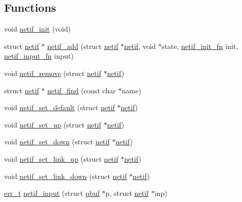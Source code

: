 \subsection*{Functions}
\begin{DoxyCompactItemize}
\item 
void \hyperlink{openmote-cc2538_2lwip_2src_2include_2lwip_2netif_8h_a0f4a53e47c840904f824a2a1c0d4ebf4}{netif\+\_\+init} (void)
\item 
struct \hyperlink{structnetif}{netif} $\ast$ \hyperlink{group__netif_gabde72af134ae7047a46ad7719d2a1ee9}{netif\+\_\+add} (struct \hyperlink{structnetif}{netif} $\ast$\hyperlink{structnetif}{netif}, void $\ast$state, \hyperlink{openmote-cc2538_2lwip_2src_2include_2lwip_2netif_8h_a2b02a78a8769925ff8e4f83d34e5e1f5}{netif\+\_\+init\+\_\+fn} init, \hyperlink{openmote-cc2538_2lwip_2src_2include_2lwip_2netif_8h_ab2302b1b64ac7b95f24c6bab754a575e}{netif\+\_\+input\+\_\+fn} input)
\item 
void \hyperlink{group__netif_ga9c6e541f0c184e1ea61a5cd8afe3e979}{netif\+\_\+remove} (struct \hyperlink{structnetif}{netif} $\ast$\hyperlink{structnetif}{netif})
\item 
struct \hyperlink{structnetif}{netif} $\ast$ \hyperlink{group__netif_ga3c82d1c742338828b2f4349a75bb84de}{netif\+\_\+find} (const char $\ast$name)
\item 
void \hyperlink{group__netif_gac90f290edd005238d62aa94c4ac9dea3}{netif\+\_\+set\+\_\+default} (struct \hyperlink{structnetif}{netif} $\ast$\hyperlink{structnetif}{netif})
\item 
void \hyperlink{group__netif_gaf19693be401a265a52d2a56c65753121}{netif\+\_\+set\+\_\+up} (struct \hyperlink{structnetif}{netif} $\ast$\hyperlink{structnetif}{netif})
\item 
void \hyperlink{group__netif_ga641d07ed8c31fe5306bc01605a6790cf}{netif\+\_\+set\+\_\+down} (struct \hyperlink{structnetif}{netif} $\ast$\hyperlink{structnetif}{netif})
\item 
void \hyperlink{group__netif_gae0d2975f189277990e9d5276fdd9e9ea}{netif\+\_\+set\+\_\+link\+\_\+up} (struct \hyperlink{structnetif}{netif} $\ast$\hyperlink{structnetif}{netif})
\item 
void \hyperlink{group__netif_ga34e37a1e8e358760dc1c43887922c7db}{netif\+\_\+set\+\_\+link\+\_\+down} (struct \hyperlink{structnetif}{netif} $\ast$\hyperlink{structnetif}{netif})
\item 
\hyperlink{group__infrastructure__errors_gaf02d9da80fd66b4f986d2c53d7231ddb}{err\+\_\+t} \hyperlink{group__lwip__nosys_ga5532f93d68c874fb99c681bff2165385}{netif\+\_\+input} (struct \hyperlink{structpbuf}{pbuf} $\ast$p, struct \hyperlink{structnetif}{netif} $\ast$inp)
\end{DoxyCompactItemize}
